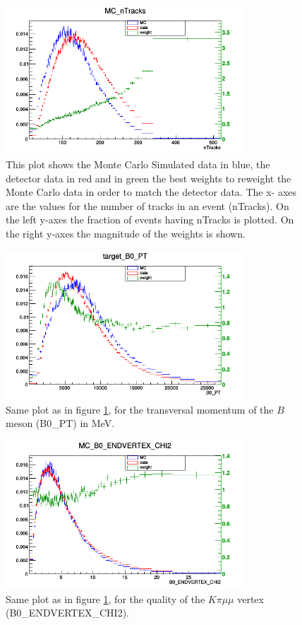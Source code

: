 \documentclass[english]{uzhpub}
\begin{document}
\begin{figure}[H]
\centering
\includegraphics[width=0.8\textwidth]{Reweighting/nTracksw}
\caption{This plot shows the Monte Carlo Simulated data in blue, the detector data in red and in green the best weights to reweight the Monte Carlo data in order to match the detector data. The x- axes are the values for the number of tracks in an event (nTracks). On the left y-axes the fraction of events having nTracks is plotted. On the right y-axes the magnitude of the weights is shown.}
\label{fig:nTracksw}
\end{figure}

\begin{figure}[H]
\centering
\includegraphics[width=0.8\textwidth]{Reweighting/B0_PTw}
\caption{Same plot as in figure \ref{fig:nTracksw}, for the transversal momentum of the $B$ meson (B0\_PT) in MeV.}
\label{fig:B0_PTw}
\end{figure}

\begin{figure}[H]
\centering
\includegraphics[width=0.8\textwidth]{Reweighting/B0_ENDVERTEX_CHI2w}
\caption{Same plot as in figure \ref{fig:nTracksw}, for the quality of the $K \pi \mu \mu$ vertex (B0\_ENDVERTEX\_CHI2).}
\label{fig:B0_ENDVERTEX_CHI2w}
\end{figure}
\end{document}

